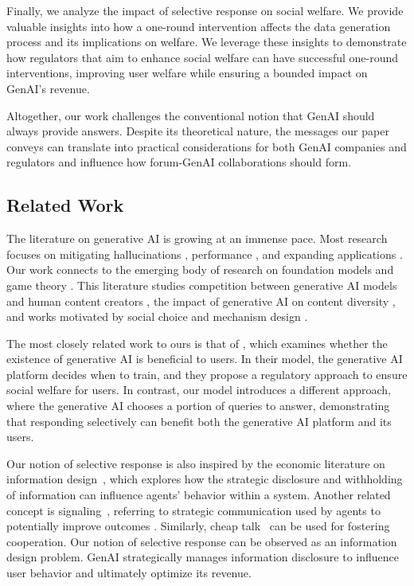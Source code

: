 Finally, we analyze the impact of selective response on social welfare. We provide valuable insights into how a one-round intervention affects the data generation process and its implications on welfare. We leverage these insights to demonstrate how regulators that aim to enhance social welfare can have successful one-round interventions, improving user welfare while ensuring a bounded impact on GenAI's revenue.

Altogether, our work challenges the conventional notion that GenAI should always provide answers. Despite its theoretical nature, the messages our paper conveys can translate into practical considerations for both GenAI companies and regulators and influence how forum-GenAI collaborations should form.


\subsection{Related Work}

The literature on generative AI is growing at an immense pace. Most research focuses on mitigating hallucinations \cite{ji2023survey}, performance \cite{frieder2024mathematical, kocon2023chatgpt, li2024more, chow2024inference}, and expanding applications \cite{kasneci2023chatgpt, liu2024your}. Our work connects to the emerging body of research on foundation models and game theory \cite{raghavan2024competition, laufer2024fine, conitzerposition, dean2024accounting}. This literature studies competition between generative AI models and human content creators \cite{yao2024human, esmaeili2024strategize}, the impact of generative AI on content diversity \cite{raghavan2024competition}, and works motivated by social choice and mechanism design \cite{conitzerposition, sun2024mechanism}. 

The most closely related work to ours is that of \citet{taitler2024braess}, which examines whether the existence of generative AI is beneficial to users. In their model, the generative AI platform decides when to train, and they propose a regulatory approach to ensure social welfare for users. In contrast, our model introduces a different approach, where the generative AI chooses a portion of queries to answer, demonstrating that responding selectively can benefit both the generative AI platform and its users.

Our notion of selective response is also inspired by the economic literature on information design~\cite{bergemann2019information,bergemann2015limits}, which explores how the strategic disclosure and withholding of information can influence agents' behavior within a system. Another related concept is signaling~\cite{crawford1982strategic,milgrom1981good}, referring to strategic communication used by agents to potentially improve outcomes \cite{babichenko2023algorithmic, lu2023adversarial}. Similarly, cheap talk~\cite{lo2023cheap, crandall2018cooperating} can be used for fostering cooperation. 
Our notion of selective response can be observed as an information design problem. GenAI strategically manages information disclosure to influence user behavior and ultimately optimize its revenue. 

